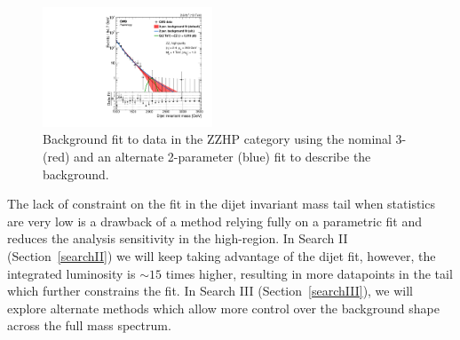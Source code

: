 \begin{figure}[h!]
\centering
\includegraphics[width=0.45\textwidth]{figures/analysis/search1/misc/CMS-PAS-EXO-15-002_Figure_004-e.pdf}
\caption{Background fit to data in the ZZHP category using the nominal 3- (red) and an alternate 2-parameter (blue) fit to describe the background.}
\label{fig:app:ZZHP2vs3p}
\end{figure}
The lack of constraint on the fit in the dijet invariant mass tail when statistics are very low is a drawback of a method relying fully on a parametric fit and reduces the analysis sensitivity in the high-\mjj region. In Search II (Section~\ref{searchII}) we will keep taking advantage of the dijet fit, however, the integrated luminosity is $\sim 15$ times higher, resulting in more datapoints in the \mjj tail which further constrains the fit. In Search III (Section~\ref{searchIII}), we will explore alternate methods which allow more control over the background shape across the full mass spectrum. 

